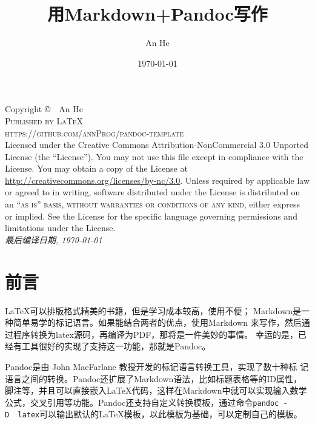 \documentclass[cn]{elegantbook}
\title{用Markdown+Pandoc写作}
\author{An He}
\date{\today}
\begin{document}
\frontmatter

\maketitle

\newpage
\thispagestyle{empty}

\noindent Copyright \copyright\ \the\year\  An He\\ %

\noindent \textsc{Published by \LaTeX}\\ %
\noindent \textsc{https://github.com/annProg/pandoc-template}\\ %

\noindent Licensed under the Creative Commons Attribution-NonCommercial 3.0 Unported License (the ``License''). You may not use this file except in compliance with the License. You may obtain a copy of the License at \url{http://creativecommons.org/licenses/by-nc/3.0}. Unless required by applicable law or agreed to in writing, software distributed under the License is distributed on an \textsc{``as is'' basis, without warranties or conditions of any kind}, either express or implied. See the License for the specific language governing permissions and limitations under the License.\\ %

\noindent \textit{最后编译日期, \today\ \currenttime } %

\tableofcontents

\listoftables
{}
\listoffigures
{}

\clearpage
\thispagestyle{empty}

\hypertarget{ux524dux8a00}{%
\chapter{前言}\label{ux524dux8a00}}

LaTeX可以排版格式精美的书籍，但是学习成本较高，使用不便；
Markdown是一种简单易学的标记语言。如果能结合两者的优点，使用Markdown
来写作，然后通过程序转换为latex源码，再编译为PDF，那将是一件美妙的事情。
幸运的是，已经有工具很好的实现了支持这一功能，那就是Pandoc。

Pandoc是由 John MacFarlane 教授开发的标记语言转换工具，实现了数十种标
记语言之间的转换。Pandoc还扩展了Markdown语法，比如标题表格等的ID属性，
脚注等，并且可以直接嵌入LaTeX代码，这样在Markdown中就可以实现输入数学
公式，交叉引用等功能。Pandoc还支持自定义转换模板，通过命令\texttt{pandoc\ -D\ \ latex}可以输出默认的LaTeX模板，以此模板为基础，可以定制自己的模板。
\end{document}

